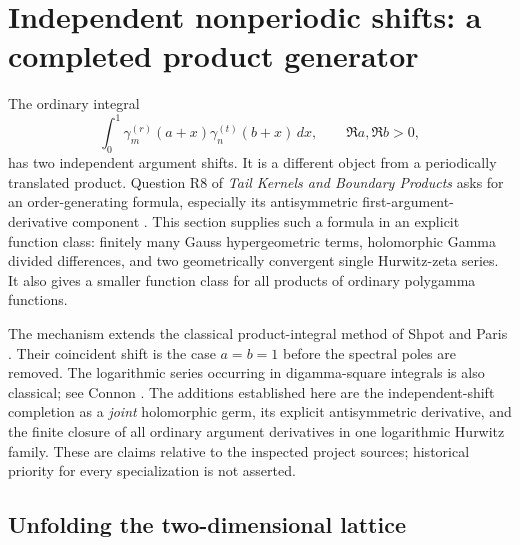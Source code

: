 \documentclass[11pt,letterpaper]{article}
\numberwithin{equation}{section}
\theoremstyle{definition}
\theoremstyle{remark}
\begin{document}


\newcommand{\gsZ}{\mathcal Z}
\newcommand{\gsJ}{\mathcal J}
\newcommand{\gsB}{\mathcal B}
\newcommand{\gsV}{\mathcal V}
\newcommand{\gsQ}{\mathcal Q}
\newcommand{\gsE}{\mathcal E}
\newcommand{\gsT}{\mathcal T}
\newcommand{\gsL}{\mathcal L}

\section{Independent nonperiodic shifts: a completed product generator}
\label{gs:section}

The ordinary integral
\[
 \int_0^1\gamma_m^{(r)}(a+x)\gamma_n^{(t)}(b+x)\,dx,
 \qquad \Re a,\Re b>0,
\]
has two independent argument shifts.  It is a different object from a
periodically translated product.  Question R8 of \emph{Tail Kernels and
Boundary Products} asks for an order-generating formula, especially its
antisymmetric first-argument-derivative component
\cite{RepoTailKernels}.  This section supplies such a formula in an
explicit function class: finitely many Gauss hypergeometric terms,
holomorphic Gamma divided differences, and two geometrically convergent
single Hurwitz-zeta series.  It also gives a smaller function class for
all products of ordinary polygamma functions.

The mechanism extends the classical product-integral method of
Shpot and Paris \cite{ShpotParis}.  Their coincident shift is the
case $a=b=1$ before the spectral poles are removed.  The logarithmic
series occurring in digamma-square integrals is also classical; see
Connon \cite{Connon}.  The additions established here are the
independent-shift completion as a \emph{joint} holomorphic germ, its
explicit antisymmetric derivative, and the finite closure of all
ordinary argument derivatives in one logarithmic Hurwitz family.
These are claims relative to the inspected project sources; historical
priority for every specialization is not asserted.

\subsection{Unfolding the two-dimensional lattice}
\end{document}
